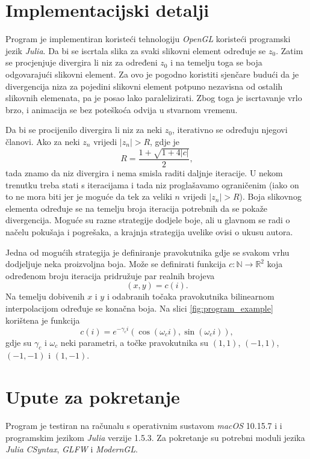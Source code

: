 \documentclass[a4paper]{article}
\begin{document}
\section{Implementacijski detalji}

Program je implementiran koristeći tehnologiju \emph{OpenGL} koristeći 
programski jezik \emph{Julia}.
Da bi se iscrtala slika za svaki slikovni element određuje se $z_0$. Zatim se 
procjenjuje divergira li niz za određeni $z_0$ i na temelju toga se boja 
odgovarajući slikovni element. Za ovo je pogodno koristiti sjenčare budući da je
divergencija niza za pojedini slikovni element potpuno nezavisna od ostalih 
slikovnih elemenata, pa je posao lako paralelizirati. Zbog toga je iscrtavanje 
vrlo brzo, i animacija se bez poteškoća odvija u stvarnom vremenu.

Da bi se procijenilo divergira li niz za neki $z_0$, iterativno se određuju 
njegovi članovi. Ako za neki $z_n$ vrijedi $|z_n| > R$, gdje je
$$R = \frac{1 + \sqrt{1 + 4|c|}}{2},$$
tada znamo da niz divergira i nema smisla raditi daljnje iteracije. U nekom 
trenutku treba stati s iteracijama i tada niz proglašavamo ograničenim (iako on
to ne mora biti jer je moguće da tek za veliki $n$ vrijedi $|z_n| > R$). Boja 
slikovnog elementa određuje se na temelju broja iteracija potrebnih da se pokaže
divergencija. Moguće su razne strategije dodjele boje, ali u glavnom se radi o
načelu pokušaja i pogrešaka, a krajnja strategija uvelike ovisi o ukusu autora.

Jedna od mogućih strategija je definiranje pravokutnika gdje se svakom vrhu 
dodjeljuje neka proizvoljna boja. Može se definirati funkcija $c: \mathbb{N} 
\rightarrow \mathbb{R}^2$ koja određenom broju iteracija pridružuje par realnih 
brojeva
$$(x, y) = c(i).$$
Na temelju dobivenih $x$ i $y$ i odabranih točaka pravokutnika bilinearnom 
interpolacijom određuje se konačna boja. Na slici \ref{fig:program_example} 
korištena je funkcija
$$c(i) = e^{-\gamma_c i}(\cos(\omega_c i), \sin(\omega_c i)),$$
gdje su $\gamma_c$ i $\omega_c$ neki parametri, a točke pravokutnika su 
$(1, 1)$, $(-1, 1)$, $(-1, -1)$ i $(1, -1)$.

\section{Upute za pokretanje}

Program je testiran na računalu s operativnim sustavom \emph{macOS} 10.15.7 i 
i programskim jezikom \emph{Julia} verzije 1.5.3. Za pokretanje su potrebni 
moduli jezika \emph{Julia} \emph{CSyntax}, \emph{GLFW} i \emph{ModernGL}.
\end{document}
